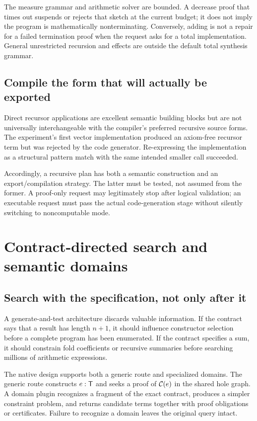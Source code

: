 The measure grammar and arithmetic solver are bounded. A decrease proof that times out suspends or rejects that sketch at the current budget; it does not imply the program is mathematically nonterminating. Conversely, adding  is not a repair for a failed termination proof when the request asks for a total implementation. General unrestricted recursion and effects are outside the default total synthesis grammar.

\subsection{Compile the form that will actually be exported}
Direct recursor applications are excellent semantic building blocks but are not universally interchangeable with the compiler's preferred recursive source forms. The experiment's first vector implementation produced an axiom-free recursor term but was rejected by the code generator. Re-expressing the implementation as a structural pattern match with the same intended smaller call succeeded.

Accordingly, a recursive plan has both a semantic construction and an export/compilation strategy. The latter must be tested, not assumed from the former. A proof-only request may legitimately stop after logical validation; an executable request must pass the actual code-generation stage without silently switching to noncomputable mode.

\section{Contract-directed search and semantic domains}
\label{sec:contracts}
\subsection{Search with the specification, not only after it}
A generate-and-test architecture discards valuable information. If the contract says that a result has length $n+1$, it should influence constructor selection before a complete program has been enumerated. If the contract specifies a sum, it should constrain fold coefficients or recursive summaries before searching millions of arithmetic expressions.

The native design supports both a generic route and specialized domains. The generic route constructs $e:\mathsf{T}$ and seeks a proof of $\mathcal{C}(e)$ in the shared hole graph. A domain plugin recognizes a fragment of the exact contract, produces a simpler constraint problem, and returns candidate terms together with proof obligations or certificates. Failure to recognize a domain leaves the original query intact.

